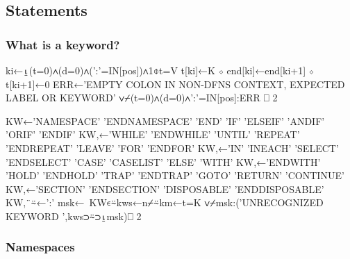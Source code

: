 \documentclass{article}%
\begin{document}
\subsection{Statements}

\subsubsection{What is a keyword?}

\nwenddocs{}\endmoddef\nwstartdeflinemarkup{}\nwenddeflinemarkup
ki←⍸(t=0)∧(d=0)∧(':'=IN[pos])∧1⌽t=V
t[ki]←K ⋄ end[ki]←end[ki+1] ⋄ t[ki+1]←0
ERR←'EMPTY COLON IN NON-DFNS CONTEXT, EXPECTED LABEL OR KEYWORD'
∨⌿(t=0)∧(d=0)∧':'=IN[pos]:ERR ⎕ 2
\nwendcode{}\nwdocspar

\nwenddocs{}\endmoddef\nwstartdeflinemarkup{}\nwenddeflinemarkup
KW←'NAMESPACE' 'ENDNAMESPACE' 'END' 'IF' 'ELSEIF' 'ANDIF' 'ORIF' 'ENDIF'
KW,←'WHILE' 'ENDWHILE' 'UNTIL' 'REPEAT' 'ENDREPEAT' 'LEAVE' 'FOR' 'ENDFOR'
KW,←'IN' 'INEACH' 'SELECT' 'ENDSELECT' 'CASE' 'CASELIST' 'ELSE' 'WITH'
KW,←'ENDWITH' 'HOLD' 'ENDHOLD' 'TRAP' 'ENDTRAP' 'GOTO' 'RETURN' 'CONTINUE'
KW,←'SECTION' 'ENDSECTION' 'DISPOSABLE' 'ENDDISPOSABLE'
KW,¨⍨←':'
msk←~KW∊⍨kws←n⌿⍨km←t=K
∨⌿msk:('UNRECOGNIZED KEYWORD ',kws⊃⍨⊃⍸msk)⎕ 2
\nwendcode{}\nwdocspar

\subsubsection{Namespaces}
\end{document}
